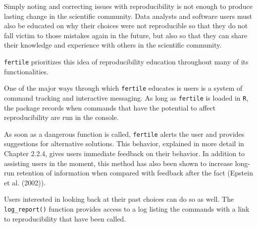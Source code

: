 \documentclass[12pt,twoside]{reedthesis}
\begin{document}
Simply noting and correcting issues with reproducibility is not enough to produce lasting change in the scientific community. Data analysts and software users must also be educated on why their choices were not reproducible so that they do not fall victim to those mistakes again in the future, but also so that they can share their knowledge and experience with others in the scientific community.

\texttt{fertile} prioritizes this idea of reproducibility education throughout many of its functionalities.

One of the major ways through which \texttt{fertile} educates is users is a system of command tracking and interactive messaging. As long as \texttt{fertile} is loaded in \texttt{R}, the package records when commands that have the potential to affect reproducibility are run in the console.

As soon as a dangerous function is called, \texttt{fertile} alerts the user and provides suggestions for alternative solutions. This behavior, explained in more detail in Chapter 2.2.4, gives users immediate feedback on their behavior. In addition to assisting users in the moment, this method has also been shown to increase long-run retention of information when compared with feedback after the fact (Epstein et al. (2002)).

Users interested in looking back at their past choices can do so as well. The \texttt{log\_report()} function provides access to a log listing the commands with a link to reproducibility that have been called.
\end{document}
